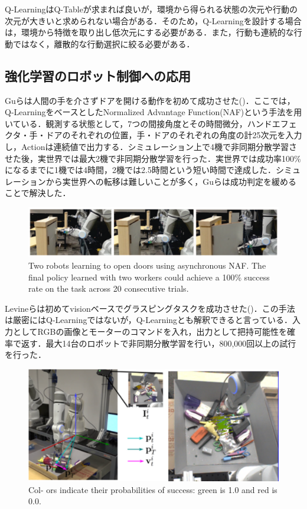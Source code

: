 Q-LearningはQ-Tableが求まれば良いが，環境から得られる状態の次元や行動の次元が大きいと求められない場合がある．そのため，Q-Learningを設計する場合は，環境から特徴を取り出し低次元にする必要がある．また，行動も連続的な行動ではなく，離散的な行動選択に絞る必要がある．


\subsection{強化学習のロボット制御への応用}
Guらは人間の手を介さずドアを開ける動作を初めて成功させた\cite{Gu2017}()．ここでは，Q-LearningをベースとしたNormalized Advantage Function(NAF)という手法を用いている．観測する状態として，7つの間接角度とその時間微分，ハンドエフェクタ・手・ドアのそれぞれの位置，手・ドアのそれぞれの角度の計25次元を入力し，Actionは連続値で出力する．シミュレーション上で4機で非同期分散学習させた後，実世界では最大2機で非同期分散学習を行った．実世界では成功率100\%になるまでに1機では4時間，2機では2.5時間という短い時間で達成した．シミュレーションから実世界への転移は難しいことが多く，Guらは成功判定を緩めることで解決した．
\begin{figure}
    \centering
    \includegraphics[width=\linewidth]{figure/chapter2/Gu}
    \caption{Two robots learning to open doors using asynchronous NAF. The final policy learned with two workers could achieve a 100\% success rate on the task across 20 consecutive trials\cite{Gu2017}.}
    \label{fig:Gu}
\end{figure}

Levineらは初めてvisionベースでグラスピングタスクを成功させた\cite{Levine2017}()．この手法は厳密にはQ-Learningではないが，Q-Learningとも解釈できると言っている．入力としてRGBの画像とモーターのコマンドを入れ，出力として把持可能性を確率で返す．最大14台のロボットで非同期分散学習を行い，800,000回以上の試行を行った．
\begin{figure}
    \centering
    \includegraphics[width=\linewidth]{figure/chapter2/Levine_grasp}
    \caption{Col- ors indicate their probabilities of success: green is 1.0 and red is 0.0\cite{Levine2017}.}
    \label{fig:Levine}
\end{figure}

